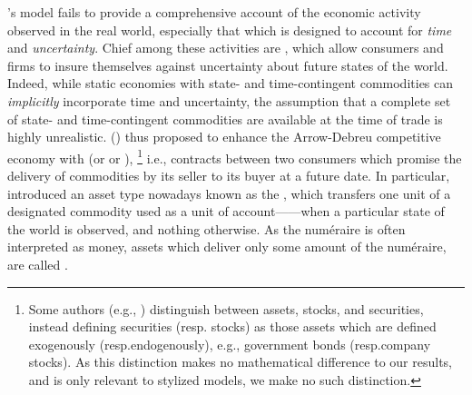 \citeauthor{arrow-debreu}'s model fails to provide a comprehensive account of the economic activity observed in the real world, especially that which is designed to account for \emph{time\/} and \emph{uncertainty}. 
Chief among these activities are 
, 
which allow consumers and firms to insure themselves against uncertainty about future states of the world. 
Indeed, while static economies with
state- and time-contingent commodities can \emph{implicitly\/} incorporate time and uncertainty, the assumption that a complete set of state- and time-contingent commodities are available at the time of trade is highly unrealistic. 
\citeauthor{arrow1964role} (\citeyear{arrow1964role}) thus proposed to 
enhance the Arrow-Debreu competitive economy %
with  (or  or ),%
\footnote{Some authors (e.g., \citet{geanakoplos1990introduction}) distinguish between assets, stocks, and securities, instead defining securities (resp. stocks) as those assets which are defined exogenously (resp.\@ endogenously), e.g., government bonds (resp.\@ company stocks). 
As this distinction makes no mathematical difference to our results, and is only relevant to stylized models, we make no such distinction.} 
i.e., contracts between two consumers which 
promise the delivery of commodities by its seller to its buyer at a future date. 
In particular, \citeauthor{arrow1964role} introduced an asset type nowadays known as the ,
which transfers one unit of a designated commodity used as a unit of account------when a particular state of the world is observed, and nothing otherwise.
As the num\'eraire is often interpreted as money, assets which deliver only some amount of the num\'eraire, are called .


